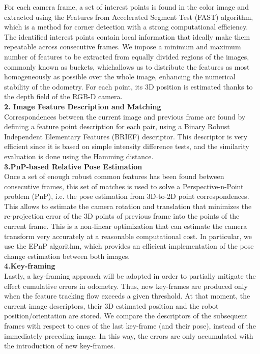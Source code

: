 \documentclass[11pt]{article}		%
\begin{document}
	For each camera frame, a set of interest points is found in the color image and extracted using the Features from Accelerated Segment Test (FAST) algorithm, which is a method for corner detection with a strong computational efficiency. The identified interest points contain local information that ideally make them repeatable across consecutive frames. We impose a minimum and maximum number of features to be extracted from equally divided
    regions of the images, commonly known as buckets, whichallows us to distribute the features as most
    homogeneously as possible over the whole image, enhancing the numerical stability of the odometry.
    For each point, its 3D position is estimated thanks to the depth field of the RGB-D camera.
	\\\textbf{2. Image Feature Description and Matching}
\\Correspondences between the current image and previous frame are found by defining a feature point description for each pair, using a Binary Robust Independent Elementary Features (BRIEF) descriptor. This descriptor is very efficient since it is based on simple intensity difference tests, and the similarity evaluation is done using the Hamming distance. 
    \\\textbf{3.PnP-based Relative Pose Estimation}
    \\Once a set of enough robust common features has been found between consecutive frames, this
set of matches is used to solve a Perspective-n-Point problem (PnP), i.e. the pose estimation from 3D-to-2D point correspondences. This allows to estimate the camera rotation and translation that minimizes the re-projection error of the 3D points of previous frame into the points of the current frame. This is a non-linear optimization that can
estimate the camera transform very accurately at a reasonable computational cost. In particular, we
use the EPnP algorithm, which provides an efficient implementation of the pose change estimation
between both images.
\\\textbf{4.Key-framing}
\\Lastly, a key-framing approach will be adopted in order to partially mitigate the effect cumulative errors in odometry. Thus, new key-frames are produced only when the feature tracking flow exceeds a given threshold. At that moment, the current image descriptors, their 3D estimated
position and the robot position/orientation are stored. We compare the descriptors of the subsequent
frames with respect to ones of the last key-frame (and their pose), instead of the immediately preceding
image. In this way, the errors are only accumulated with the introduction of new key-frames.
\end{document}
